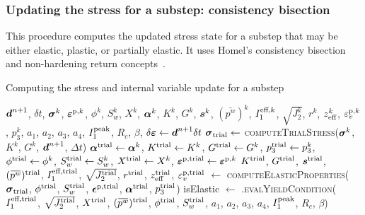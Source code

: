 \subsubsection{Updating the stress for a substep:  consistency bisection}
This procedure computes the updated stress state for a substep that may be either elastic, plastic, or 
partially elastic.  It uses Homel's consistency bisection and non-hardening return 
concepts~\cite{Homel2015}.

\begin{breakablealgorithm}
  \caption{Computing the stress and internal variable update for a substep}
  \begin{algorithmic}[1]
    \Require $\boldsymbol{d}^{n+1}$, $\delta t$, $\boldsymbol{\sigma}^k$, $\boldsymbol{\varepsilon}^{\text{p},k}$, $\phi^k$, $S_w^k$, $X^k$, $\boldsymbol{\alpha}^k$, 
             $K^k$, $G^k$, $\boldsymbol{s}^k$, $(\bar{p^w})^k$, $I_1^{\text{eff},k}$, 
             $\sqrt{J_2^k}$, $r^k$, $z_{\text{eff}}^k$, $\varepsilon_v^{\text{p},k}$,
             $p_3^k$, $a_1$, $a_2$, $a_3$, $a_4$, $I_1^{\text{peak}}$, $R_c$, $\beta$,
      \State $\delta \boldsymbol{\varepsilon} \leftarrow \boldsymbol{d}^{n+1} \delta t$
      \State $\boldsymbol{\sigma}_{\text{trial}} \leftarrow$ \textsc{computeTrialStress}($\boldsymbol{\sigma}^k$, $K^k$, $G^k$,
                                                                  $\boldsymbol{d}^{n+1}$, $\Delta t$)
      \State $\boldsymbol{\alpha}^{\text{trial}} \leftarrow \boldsymbol{\alpha}^k$, 
             $K^{\text{trial}} \leftarrow K^k$, 
             $G^{\text{trial}} \leftarrow G^k$, 
             $p_3^{\text{trial}} \leftarrow p_3^k$, 
             $\phi^{\text{trial}} \leftarrow \phi^k$, 
             $S_w^{\text{trial}} \leftarrow S_w^k$, \WRP
             $X^{\text{trial}} \leftarrow X^k$, 
             $\boldsymbol{\varepsilon}^{\text{p},\text{trial}} \leftarrow \boldsymbol{\varepsilon}^{\text{p},k}$ 
      \State $K^{\text{trial}}$, $G^{\text{trial}}$, $\boldsymbol{s}^{\text{trial}}$, $(\bar{p^w})^\Trial$, $I_1^{\text{eff},\text{trial}}$, 
             $\sqrt{J_2^{\text{trial}}}$, $r^{\text{trial}}$, $z_{\text{eff}}^{\text{trial}}$, $\varepsilon_v^{\text{p},\text{trial}}$ $\leftarrow$ \WRP
          \textsc{computeElasticProperties}($\boldsymbol{\sigma}_{\text{trial}}$, 
             $\phi^{\text{trial}}$, $S_w^{\text{trial}}$, $\boldsymbol{\epsilon}^{\text{p},\text{trial}}$, $\boldsymbol{\alpha}^{\text{trial}}$, $p_3^{\text{trial}}$) \WRP
      \State isElastic $\leftarrow$ 
        .\textsc{evalYieldCondition}($I_1^{\text{eff},\text{trial}}$, $\sqrt{J_2^{\text{trial}}}$, 
          $X^{\text{trial}}$, $(\bar{p^w})^\Trial$, $\phi^{\text{trial}}$, $S_w^{\text{trial}}$, \WRP
          $a_1$, $a_2$, $a_3$, $a_4$, $I_1^{\text{peak}}$, $R_c$, $\beta$) \WRP

\end{algorithmic}
\end{breakablealgorithm}
